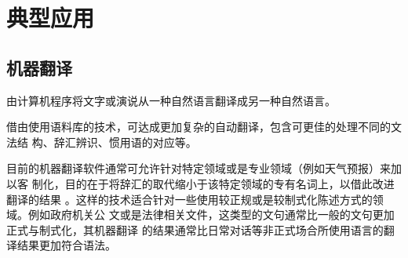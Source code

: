 \documentclass[../main]{subfiles}
\begin{document}
\chapter{典型应用}%
\label{cha:method}

\section{机器翻译}%
\label{sec:translate}

\begin{definition}[机器翻译]
  由计算机程序将文字或演说从一种自然语言翻译成另一种自然语言。
\end{definition}

借由使用语料库的技术，可达成更加复杂的自动翻译，包含可更佳的处理不同的文法结
构、辞汇辨识、惯用语的对应等。

目前的机器翻译软件通常可允许针对特定领域或是专业领域（例如天气预报）来加以客
制化，目的在于将辞汇的取代缩小于该特定领域的专有名词上，以借此改进翻译的结果
。这样的技术适合针对一些使用较正规或是较制式化陈述方式的领域。例如政府机关公
文或是法律相关文件，这类型的文句通常比一般的文句更加正式与制式化，其机器翻译
的结果通常比日常对话等非正式场合所使用语言的翻译结果更加符合语法。
\end{document}
